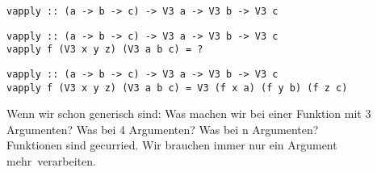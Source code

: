 \documentclass{beamer}
\begin{document}
\begin{frame}[fragile]
\begin{overprint}
\begin{verbatim}
vapply :: (a -> b -> c) -> V3 a -> V3 b -> V3 c
\end{verbatim}
\begin{verbatim}
vapply :: (a -> b -> c) -> V3 a -> V3 b -> V3 c
vapply f (V3 x y z) (V3 a b c) = ?
\end{verbatim}
\begin{verbatim}
vapply :: (a -> b -> c) -> V3 a -> V3 b -> V3 c
vapply f (V3 x y z) (V3 a b c) = V3 (f x a) (f y b) (f z c)
\end{verbatim}
\end{overprint}
\pause
\pause
\pause
Wenn wir schon generisch sind: Was machen wir bei einer Funktion mit 3 Argumenten? \pause
 Was bei 4 Argumenten? \pause Was bei n Argumenten?\pause \\\bigskip
Funktionen sind gecurried. Wir brauchen immer nur \glqq ein Argument mehr\grqq \ verarbeiten.
\end{frame}
\end{document}
